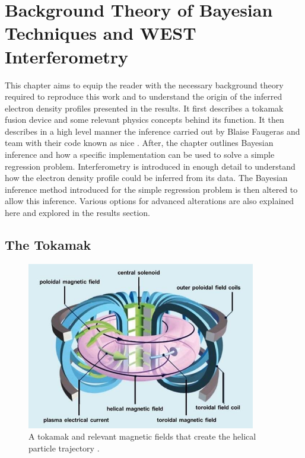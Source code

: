 \chapter{Background Theory of Bayesian Techniques and WEST Interferometry}

This chapter aims to equip the reader with the necessary background theory required to reproduce this work and to understand the origin of the inferred electron density profiles presented in the results. It first describes a tokamak fusion device and some relevant physics concepts behind its function. It then describes in a high level manner the inference carried out by Blaise Faugeras and team with their code known as \gls{nice} \cite{nice}. After, the chapter outlines Bayesian inference and how a specific implementation can be used to solve a simple regression problem. Interferometry is introduced in enough detail to understand how the electron density profile could be inferred from its data. The Bayesian inference method introduced for the simple regression problem is then altered to allow this inference. Various options for advanced alterations are also explained here and explored in the results section.

\section{The Tokamak}

\begin{figure}[H]
  \centering
  \includegraphics[width=10cm]{images/tokamak.jpg}
  \caption{A tokamak and relevant magnetic fields that create the helical particle trajectory \cite{tokamakSchema}.}
  \label{fig:tokamakSchema}
\end{figure}

